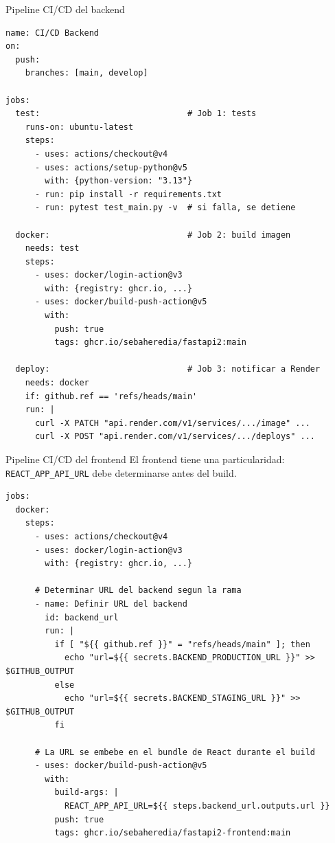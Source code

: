 \documentclass[aspectratio=169]{beamer}
\begin{document}
\begin{frame}[fragile]{Pipeline CI/CD del backend}
  \begin{lstlisting}[style=yaml]
name: CI/CD Backend
on:
  push:
    branches: [main, develop]

jobs:
  test:                              # Job 1: tests
    runs-on: ubuntu-latest
    steps:
      - uses: actions/checkout@v4
      - uses: actions/setup-python@v5
        with: {python-version: "3.13"}
      - run: pip install -r requirements.txt
      - run: pytest test_main.py -v  # si falla, se detiene

  docker:                            # Job 2: build imagen
    needs: test
    steps:
      - uses: docker/login-action@v3
        with: {registry: ghcr.io, ...}
      - uses: docker/build-push-action@v5
        with:
          push: true
          tags: ghcr.io/sebaheredia/fastapi2:main

  deploy:                            # Job 3: notificar a Render
    needs: docker
    if: github.ref == 'refs/heads/main'
    run: |
      curl -X PATCH "api.render.com/v1/services/.../image" ...
      curl -X POST "api.render.com/v1/services/.../deploys" ...
  \end{lstlisting}
\end{frame}

\begin{frame}[fragile]{Pipeline CI/CD del frontend}
  El frontend tiene una particularidad: \texttt{REACT\_APP\_API\_URL} debe determinarse antes del build.

  \begin{lstlisting}[style=yaml]
jobs:
  docker:
    steps:
      - uses: actions/checkout@v4
      - uses: docker/login-action@v3
        with: {registry: ghcr.io, ...}

      # Determinar URL del backend segun la rama
      - name: Definir URL del backend
        id: backend_url
        run: |
          if [ "${{ github.ref }}" = "refs/heads/main" ]; then
            echo "url=${{ secrets.BACKEND_PRODUCTION_URL }}" >> $GITHUB_OUTPUT
          else
            echo "url=${{ secrets.BACKEND_STAGING_URL }}" >> $GITHUB_OUTPUT
          fi

      # La URL se embebe en el bundle de React durante el build
      - uses: docker/build-push-action@v5
        with:
          build-args: |
            REACT_APP_API_URL=${{ steps.backend_url.outputs.url }}
          push: true
          tags: ghcr.io/sebaheredia/fastapi2-frontend:main
  \end{lstlisting}
\end{frame}
\end{document}
